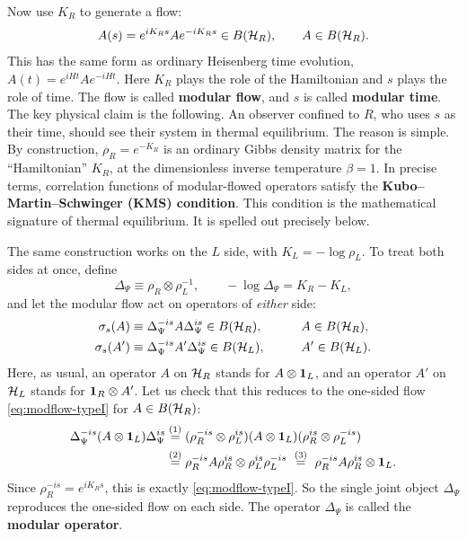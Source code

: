 Now use $K_R$ to generate a flow:
\begin{equation}
A(s) = e^{iK_Rs}Ae^{-iK_Rs} \in B(\mathcal{H}_R), \qquad A\in B(\mathcal{H}_R) .
\label{eq:modflow-typeI}
\end{equation}
This has the same form as ordinary Heisenberg time evolution, $A(t)=e^{iHt}Ae^{-iHt}$. Here $K_R$ plays the
role of the Hamiltonian and $s$ plays the role of time. The flow is called \textbf{modular flow}, and $s$ is
called \textbf{modular time}. The key physical claim is the following. An observer confined to $R$, who uses
$s$ as their time, should see their system in thermal equilibrium. The reason is simple. By construction,
$\rho_R=e^{-K_R}$ is an ordinary Gibbs density matrix for the ``Hamiltonian'' $K_R$, at the dimensionless
inverse temperature $\beta=1$. In precise terms, correlation functions of modular-flowed operators satisfy the
\textbf{Kubo--Martin--Schwinger (KMS) condition}. This condition is the mathematical signature of thermal
equilibrium. It is spelled out precisely below.

The same construction works on the $L$ side, with $K_L=-\log\rho_L$. To treat both sides at once, define
\begin{equation}
\Delta_\Psi \equiv \rho_R\otimes\rho_L^{-1}, \qquad -\log\Delta_\Psi = K_R - K_L ,
\label{eq:Delta-typeI}
\end{equation}
and let the modular flow act on operators of \emph{either} side:
\[
\begin{aligned}
\sigma_s(A) &\equiv \Delta_\Psi^{-is}A\Delta_\Psi^{is}\in B(\mathcal{H}_R), &\qquad& A\in B(\mathcal{H}_R), \\
\sigma_s(A') &\equiv \Delta_\Psi^{-is}A'\Delta_\Psi^{is}\in B(\mathcal{H}_L), && A'\in B(\mathcal{H}_L) .
\end{aligned}
\]
Here, as usual, an operator $A$ on $\mathcal{H}_R$ stands for $A\otimes\mathbf{1}_L$, and an operator $A'$ on $\mathcal{H}_L$ stands
for $\mathbf{1}_R\otimes A'$. Let us check that this reduces to the one-sided flow \eqref{eq:modflow-typeI} for
$A\in B(\mathcal{H}_R)$:
\begin{align}
\Delta_\Psi^{-is}(A\otimes\mathbf{1}_L)\Delta_\Psi^{is}
&\overset{(1)}{=} (\rho_R^{-is}\otimes\rho_L^{is})(A\otimes\mathbf{1}_L)(\rho_R^{is}\otimes\rho_L^{-is}) \notag\\
&\overset{(2)}{=} \rho_R^{-is}A\rho_R^{is}\otimes\rho_L^{is}\rho_L^{-is}
\ \overset{(3)}{=}\ \rho_R^{-is}A\rho_R^{is}\otimes\mathbf{1}_L . \notag
\end{align}
\quad
{}\quad
{}
Since $\rho_R^{-is}=e^{iK_Rs}$, this is exactly \eqref{eq:modflow-typeI}. So the single joint object
$\Delta_\Psi$ reproduces the one-sided flow on each side. The operator $\Delta_\Psi$ is called the
\textbf{modular operator}.

